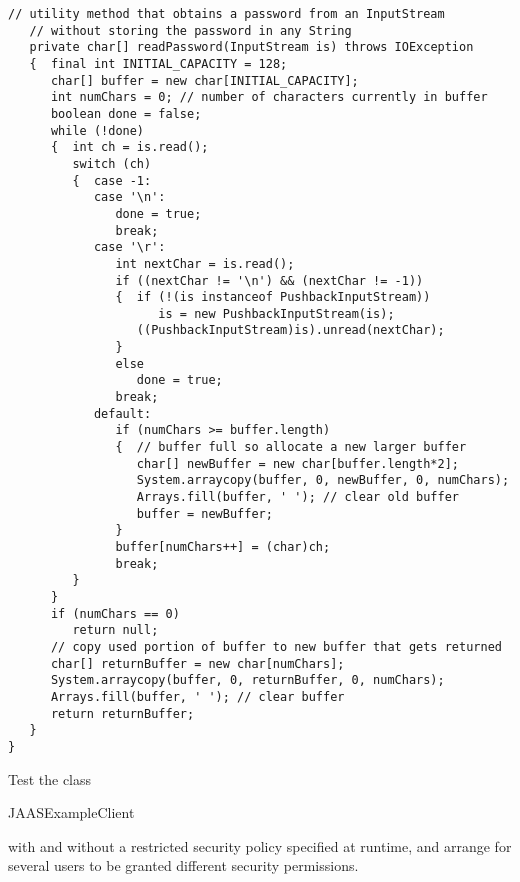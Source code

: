\begin{lstlisting}[caption=JAAS Callback Handler]
   // utility method that obtains a password from an InputStream
   // without storing the password in any String
   private char[] readPassword(InputStream is) throws IOException
   {  final int INITIAL_CAPACITY = 128;
      char[] buffer = new char[INITIAL_CAPACITY];
      int numChars = 0; // number of characters currently in buffer
      boolean done = false;
      while (!done)
      {  int ch = is.read();
         switch (ch)
         {  case -1:
            case '\n':
               done = true;
               break;
            case '\r':
               int nextChar = is.read();
               if ((nextChar != '\n') && (nextChar != -1))
               {  if (!(is instanceof PushbackInputStream))
                     is = new PushbackInputStream(is);
                  ((PushbackInputStream)is).unread(nextChar);
               }
               else
                  done = true;
               break;
            default:
               if (numChars >= buffer.length)
               {  // buffer full so allocate a new larger buffer
                  char[] newBuffer = new char[buffer.length*2];
                  System.arraycopy(buffer, 0, newBuffer, 0, numChars);
                  Arrays.fill(buffer, ' '); // clear old buffer
                  buffer = newBuffer;
               }
               buffer[numChars++] = (char)ch;
               break;
         }
      }
      if (numChars == 0)
         return null;
      // copy used portion of buffer to new buffer that gets returned
      char[] returnBuffer = new char[numChars];
      System.arraycopy(buffer, 0, returnBuffer, 0, numChars);
      Arrays.fill(buffer, ' '); // clear buffer
      return returnBuffer;
   }
}
\end{lstlisting}


\begin{exercise}
  Test the class \begin{code}JAAS\-ExampleClient\end{code} with and
  without a restricted security policy specified at runtime,
  and arrange for several users to be granted different security permissions.
\end{exercise}



